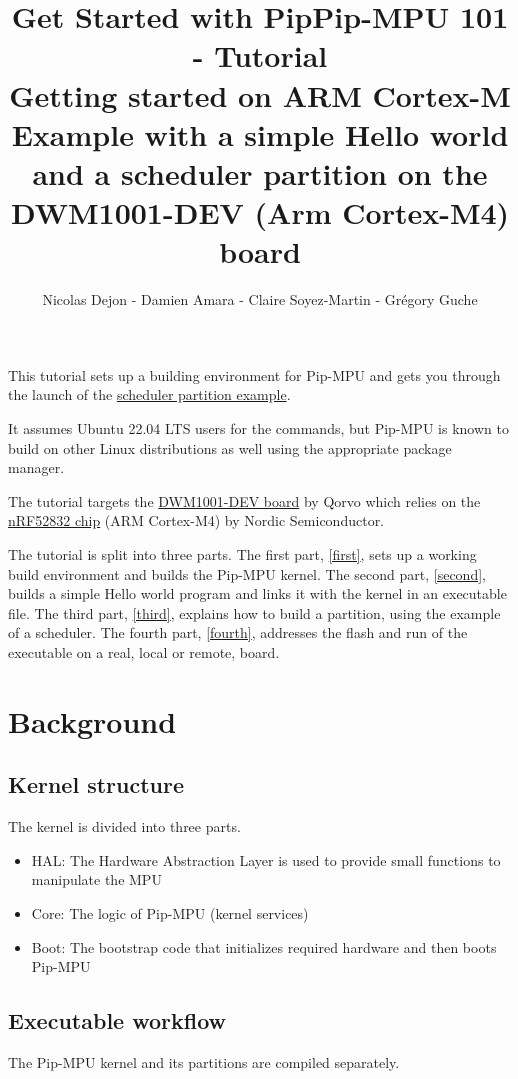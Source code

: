 \documentclass[10pt,a4paper,titlepage]{refart}
\title{Get Started with Pip}
\author{Nicolas Dejon - Damien Amara - Claire Soyez-Martin - Grégory Guche}
\title{Pip-MPU 101 -  Tutorial \\ Getting started on ARM Cortex-M \\ Example with a simple Hello world and a scheduler partition on the DWM1001-DEV (Arm Cortex-M4) board\\}
\begin{document}
\maketitle
\tableofcontents
\pagebreak

This tutorial sets up a building environment for Pip-MPU and gets you through the launch of the \href{(https://gitlab.univ-lille.fr/2xs/pip/pip-mpu-scheduler)}{scheduler partition example}.

It assumes Ubuntu 22.04 LTS users for the commands, but Pip-MPU is known to build on other Linux distributions as well using the appropriate package manager.

The tutorial targets the \href{https://www.qorvo.com/products/d/da007952}{DWM1001-DEV board} by Qorvo which relies on the \href{https://www.nordicsemi.com/products/nrf52832}{nRF52832 chip} (ARM Cortex-M4) by Nordic Semiconductor.

The tutorial is split into three parts.
The first part, \cref{first}, sets up a working build environment and builds the Pip-MPU kernel.
The second part, \cref{second}, builds a simple Hello world program and links it with the kernel in an executable file.
The third part, \cref{third}, explains how to build a partition, using the example of a scheduler.
The fourth part, \cref{fourth}, addresses the flash and run of the executable on a real, local or remote, board.

\section{Background}

\subsection{Kernel structure}

The kernel is divided into three parts.

\begin{itemize}
    \item HAL: The Hardware Abstraction Layer is used to provide small functions to manipulate the MPU
    \item Core: The logic of Pip-MPU (kernel services)
    \item Boot: The bootstrap code that initializes required hardware and then boots Pip-MPU
\end{itemize}

\subsection{Executable workflow}
The Pip-MPU kernel and its partitions are compiled separately.
\end{document}

